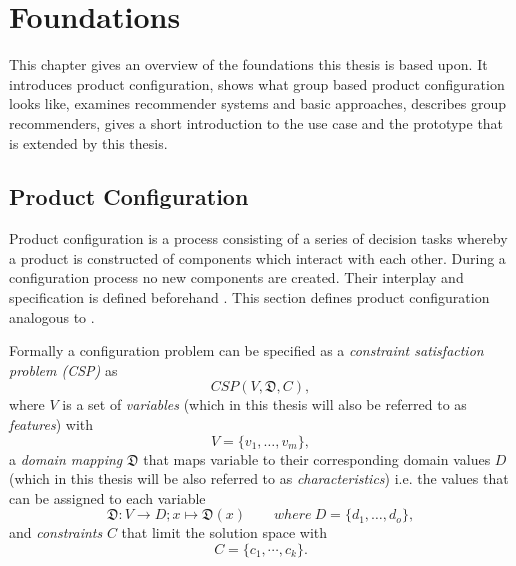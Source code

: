 \chapter{Foundations}
\label{ch:Foundations}

This chapter gives an overview of the foundations this thesis is based upon. It introduces product configuration, shows what group based product configuration looks like, examines recommender systems and basic approaches, describes group recommenders, gives a short introduction to the use case and the prototype that is extended by this thesis.

\section{Product Configuration}
\label{sec:Foundations:ProductConfiguration}

Product configuration is a process consisting of a series of decision tasks whereby a product is constructed of components which interact with each other. During a configuration process no new components are created. Their interplay and specification is defined beforehand \cite[~ pp. 42, 43]{sabinProductConfigurationFrameworksa1998}. This section defines product configuration analogous to \citeauthor{felfernigOpenConfiguration2014} \cite{felfernigOpenConfiguration2014}.

Formally a configuration problem can be specified as a \emph{constraint satisfaction problem (CSP)} \cite{tsangFoundationsConstraintSatisfaction1993} as 
\begin{equation} \label{eq:Foundations:ProductConfiguration:ConstraintSatisfactionProblem}
    CSP(V,\mathfrak{D},C),
\end{equation}
where $V$ is a set of \emph{variables} (which in this thesis will also be referred to as \emph{features}) with
\begin{equation} \label{eq:Foundations:ProductConfiguration:Variables}
    V = \{v_1, \dotsc, v_m\},
\end{equation}
a \emph{domain mapping} $\mathfrak{D}$ that maps variable to their corresponding domain values $D$ (which in this thesis will be also referred to as \emph{characteristics}) i.e. the values that can be assigned to each variable
\begin{equation}\label{eq:Foundations:ProductConfiguration:DomainMapping}
    \mathfrak{D} : V \to D; x \mapsto \mathfrak{D}(x) \qquad where \ D = \{d_1, \dotsc, d_o\},
\end{equation}
and \emph{constraints} $C$ that limit the solution space with 
\begin{equation}\label{eq:Foundations:ProductConfiguration:Constraints}
    C = \{c_1, \cdots, c_k\}.
\end{equation}

